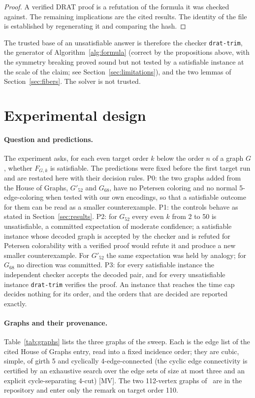 \documentclass[11pt]{article}
\theoremstyle{definition}
\theoremstyle{remark}
\newcommand{\Ga}{G_{52}}
\newcommand{\Gb}{G'_{52}}
\newcommand{\Gsix}{G_{68}}
\newcommand{\evMV}{\textnormal{[MV]}}
\begin{document}
\begin{proof}
A verified DRAT proof is a refutation of the formula it was checked against. The remaining implications are the cited results. The identity of the file is established by regenerating it and comparing the hash.
\end{proof}

The trusted base of an unsatisfiable answer is therefore the checker \texttt{drat-trim}, the generator of Algorithm~\ref{alg:formula} (correct by the propositions above, with the symmetry breaking proved sound but not tested
by a satisfiable instance at the scale of the claim; see Section~\ref{sec:limitations}), and the two lemmas of Section~\ref{sec:fibers}. The solver is not trusted.

\section{Experimental design}\label{sec:design}

\paragraph{Question and predictions.} The experiment asks, for each even target order $k$ below the order $n$ of a graph $G$, whether $F_{G,k}$ is satisfiable. The predictions were fixed before the first
target run and are restated here with their decision rules. P0: the two graphs added from the House of Graphs, $\Gb$ and $\Gsix$, have no Petersen coloring and no normal 5-edge-coloring when tested with our
own encodings, so that a satisfiable outcome for them can be read as a smaller counterexample. P1: the controls behave as stated in Section~\ref{sec:results}. P2: for $\Ga$ every even $k$ from 2 to 50 is unsatisfiable,
a committed expectation of moderate confidence; a satisfiable instance whose decoded graph is accepted by the checker and is refuted for Petersen colorability with a verified proof would refute it and produce a new
smaller counterexample. For $\Gb$ the same expectation was held by analogy; for $\Gsix$ no direction was committed. P3: for every satisfiable instance the independent checker accepts the decoded pair, and for every
unsatisfiable instance \texttt{drat-trim} verifies the proof. An instance that reaches the time cap decides nothing for its order, and the orders that are decided are reported exactly.

\paragraph{Graphs and their provenance.} Table~\ref{tab:graphs} lists the three graphs of the sweep. Each is the edge list of the cited House of Graphs entry, read into a fixed incidence order; they are cubic, simple, of girth 5 and
cyclically 4-edge-connected (the cyclic edge connectivity is certified by an exhaustive search over the edge sets of size at most three and an explicit cycle-separating 4-cut) \evMV{}. The two 112-vertex graphs of~\cite{Putman2026} are in the repository and enter only
the remark on target order 110.
\end{document}
